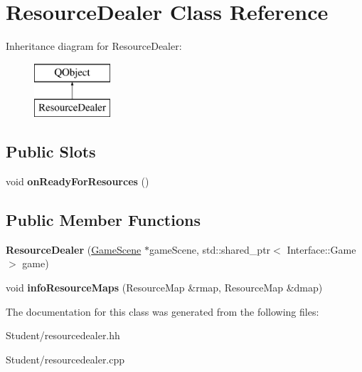 \hypertarget{class_resource_dealer}{\section{Resource\-Dealer Class Reference}
\label{class_resource_dealer}
}
Inheritance diagram for Resource\-Dealer\-:\begin{figure}[H]
\begin{center}
\leavevmode
\includegraphics[height=2.000000cm]{class_resource_dealer}
\end{center}
\end{figure}
\subsection*{Public Slots}
\begin{DoxyCompactItemize}
\item 
\hypertarget{class_resource_dealer_abc353d59fd90a2c0490669dc769cee62}{void {\bfseries on\-Ready\-For\-Resources} ()}\label{class_resource_dealer_abc353d59fd90a2c0490669dc769cee62}

\end{DoxyCompactItemize}
\subsection*{Public Member Functions}
\begin{DoxyCompactItemize}
\item 
\hypertarget{class_resource_dealer_a743e0c3533d2599d2d344a3f2807e697}{{\bfseries Resource\-Dealer} (\hyperlink{class_game_scene}{Game\-Scene} $\ast$game\-Scene, std\-::shared\-\_\-ptr$<$ Interface\-::\-Game $>$ game)}\label{class_resource_dealer_a743e0c3533d2599d2d344a3f2807e697}

\item 
\hypertarget{class_resource_dealer_ae9708e77ff79b6d21782ad984870471d}{void {\bfseries info\-Resource\-Maps} (Resource\-Map \&rmap, Resource\-Map \&dmap)}\label{class_resource_dealer_ae9708e77ff79b6d21782ad984870471d}

\end{DoxyCompactItemize}


The documentation for this class was generated from the following files\-:\begin{DoxyCompactItemize}
\item 
Student/resourcedealer.\-hh\item 
Student/resourcedealer.\-cpp\end{DoxyCompactItemize}
